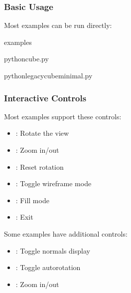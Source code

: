 \documentclass[a4paper,10pt,english,openany,oneside]{sphinxmanual}
\begin{document}
\subsubsection{Basic Usage}
\label{\detokenize{examples:basic-usage}}
\sphinxAtStartPar
Most examples can be run directly:

\begin{sphinxVerbatim}[commandchars=\\\{\}]
examples

pythoncube.py

pythonlegacy\PYGZus{}cube\PYGZus{}minimal.py
\end{sphinxVerbatim}


\subsubsection{Interactive Controls}
\label{\detokenize{examples:interactive-controls}}
\sphinxAtStartPar
Most examples support these controls:
\begin{itemize}
\item {} 
\sphinxAtStartPar
{}: Rotate the view

\item {} 
\sphinxAtStartPar
{}: Zoom in/out

\item {} 
\sphinxAtStartPar
{}: Reset rotation

\item {} 
\sphinxAtStartPar
{}: Toggle wireframe mode

\item {} 
\sphinxAtStartPar
{}: Fill mode

\item {} 
\sphinxAtStartPar
{}: Exit

\end{itemize}

\sphinxAtStartPar
Some examples have additional controls:
\begin{itemize}
\item {} 
\sphinxAtStartPar
{}: Toggle normals display

\item {} 
\sphinxAtStartPar
{}: Toggle auto\sphinxhyphen{}rotation

\item {} 
\sphinxAtStartPar
\sphinxstylestrong{+/\sphinxhyphen{}}: Zoom in/out

\end{itemize}
\end{document}
